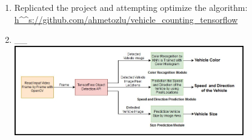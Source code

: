 \begin{enumerate}

    \item{Replicated the project and attempting optimize the algorithm: \\ \url{h^^s://github.com/ahmetozlu/vehicle_counting_tensorflow}  }  
 
    \item{ __  \\
     
            \includegraphics[width=10cm]{Chapters/Chapter_5_Section/System_Architecture.jpg}
  
    }
 
\end{enumerate}


    